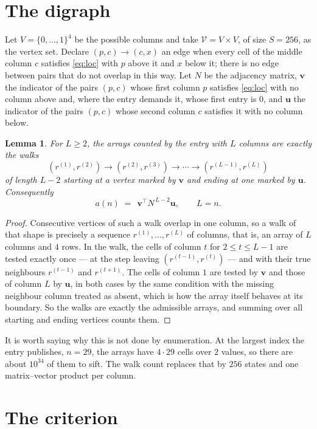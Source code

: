 \documentclass[11pt,a4paper]{article}
\theoremstyle{plain}
\newtheorem{lemma}[theorem]{Lemma}
\theoremstyle{definition}
\begin{document}
\section{The digraph}

Let $V=\{0,\dots,1\}^{4}$ be the possible columns and take
$\mathcal V=V\times V$, of size $S=256$, as the vertex set. Declare $(p,c)\to(c,x)$ an edge
when every cell of the middle column $c$ satisfies \eqref{eq:loc} with $p$ above it and $x$
below it; there is no edge between pairs that do not overlap in this way. Let $N$ be the
adjacency matrix, $\mathbf{v}$ the indicator of the pairs $(p,c)$ whose first column $p$
satisfies \eqref{eq:loc} with no column above and, where the entry demands it, whose first entry is $0$, and $\mathbf{u}$ the indicator of
the pairs $(p,c)$ whose second column $c$ satisfies it with no column below.

\begin{lemma}\label{lem:walk}
For $L\ge2$, the arrays counted by the entry with $L$ columns are exactly the walks
\[
(r^{(1)},r^{(2)})\to(r^{(2)},r^{(3)})\to\cdots\to(r^{(L-1)},r^{(L)})
\]
of length $L-2$ starting at a vertex marked by $\mathbf{v}$ and ending at one marked by
$\mathbf{u}$. Consequently
\[
a(n)\;=\;\,\mathbf{v}^{\!\top}N^{\,L-2}\mathbf{u},\qquad L=n .
\]
\end{lemma}

\begin{proof}
Consecutive vertices of such a walk overlap in one column, so a walk of that shape is
precisely a sequence $r^{(1)},\dots,r^{(L)}$ of columns, that is, an array of $L$ columns
and $4$ rows. In the walk, the cells of column $t$ for $2\le t\le L-1$ are tested
exactly once --- at the step leaving $(r^{(t-1)},r^{(t)})$ --- and with their true
neighbours $r^{(t-1)}$ and $r^{(t+1)}$. The cells of column $1$ are tested by
$\mathbf{v}$ and those of column $L$ by $\mathbf{u}$, in both cases by the same condition
with the missing neighbour column treated as absent, which is how the array itself behaves at
its boundary. So the walks are exactly the admissible arrays, and summing over all starting
and ending vertices counts them.
\end{proof}


It is worth saying why this is not done by enumeration. At the largest index the entry
publishes, $n=29$, the arrays have $4\cdot29$ cells over
$2$ values, so there are about $10^{34}$ of them to sift. The
walk count replaces that by $256$ states and one matrix--vector product per column.
\section{The criterion}
\end{document}
